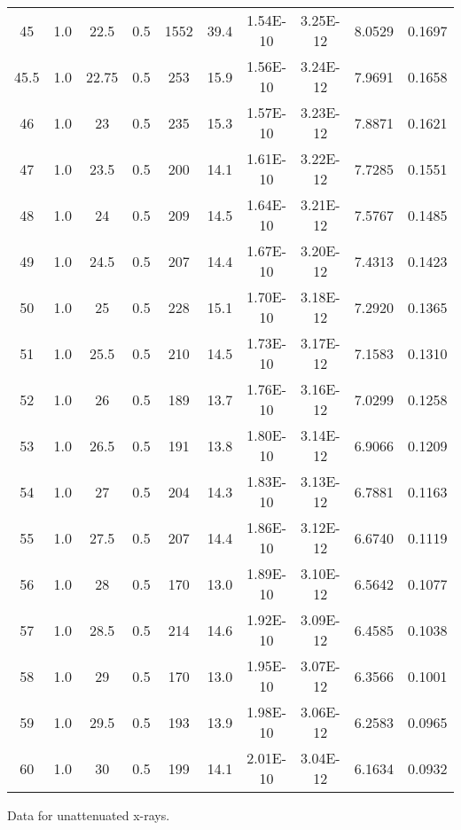 \begin{maintable}[ht]
\begin{tabular}{cccccccccc}
45          & 1.0   & 22.5       & 0.5           & 1552    & 39.4       & 1.54E-10    & 3.25E-12       & 8.0529    & 0.1697       \\
45.5        & 1.0   & 22.75      & 0.5           & 253     & 15.9       & 1.56E-10    & 3.24E-12       & 7.9691    & 0.1658       \\
46          & 1.0   & 23         & 0.5           & 235     & 15.3       & 1.57E-10    & 3.23E-12       & 7.8871    & 0.1621       \\
47          & 1.0   & 23.5       & 0.5           & 200     & 14.1       & 1.61E-10    & 3.22E-12       & 7.7285    & 0.1551       \\
48          & 1.0   & 24         & 0.5           & 209     & 14.5       & 1.64E-10    & 3.21E-12       & 7.5767    & 0.1485       \\
49          & 1.0   & 24.5       & 0.5           & 207     & 14.4       & 1.67E-10    & 3.20E-12       & 7.4313    & 0.1423       \\
50          & 1.0   & 25         & 0.5           & 228     & 15.1       & 1.70E-10    & 3.18E-12       & 7.2920    & 0.1365       \\
51          & 1.0   & 25.5       & 0.5           & 210     & 14.5       & 1.73E-10    & 3.17E-12       & 7.1583    & 0.1310       \\
52          & 1.0   & 26         & 0.5           & 189     & 13.7       & 1.76E-10    & 3.16E-12       & 7.0299    & 0.1258       \\
53          & 1.0   & 26.5       & 0.5           & 191     & 13.8       & 1.80E-10    & 3.14E-12       & 6.9066    & 0.1209       \\
54          & 1.0   & 27         & 0.5           & 204     & 14.3       & 1.83E-10    & 3.13E-12       & 6.7881    & 0.1163       \\
55          & 1.0   & 27.5       & 0.5           & 207     & 14.4       & 1.86E-10    & 3.12E-12       & 6.6740    & 0.1119       \\
56          & 1.0   & 28         & 0.5           & 170     & 13.0       & 1.89E-10    & 3.10E-12       & 6.5642    & 0.1077       \\
57          & 1.0   & 28.5       & 0.5           & 214     & 14.6       & 1.92E-10    & 3.09E-12       & 6.4585    & 0.1038       \\
58          & 1.0   & 29         & 0.5           & 170     & 13.0       & 1.95E-10    & 3.07E-12       & 6.3566    & 0.1001       \\
59          & 1.0   & 29.5       & 0.5           & 193     & 13.9       & 1.98E-10    & 3.06E-12       & 6.2583    & 0.0965       \\
60          & 1.0   & 30         & 0.5           & 199     & 14.1       & 2.01E-10    & 3.04E-12       & 6.1634    & 0.0932       \\
\end{tabular}
\caption{Data for unattenuated x-rays.}
\label{tab:xrcg1}
\end{maintable}



